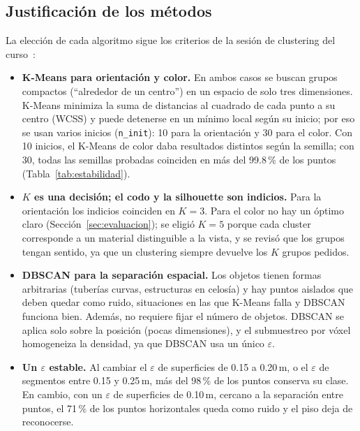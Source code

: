 \documentclass[11pt,a4paper]{article}
\begin{document}
\subsection{Justificación de los métodos}

La elección de cada algoritmo sigue los criterios de la sesión de clustering
del curso~\cite{curso}:

\begin{itemize}
  \item \textbf{K-Means para orientación y color.} En ambos casos se buscan
        grupos compactos (``alrededor de un centro'') en un espacio de solo
        tres dimensiones. K-Means minimiza la suma de distancias al cuadrado de
        cada punto a su centro (WCSS) y puede detenerse en un mínimo local según
        su inicio; por eso se usan varios inicios (\texttt{n\_init}): 10 para
        la orientación y 30 para el color. Con 10 inicios, el K-Means de color
        daba resultados distintos según la semilla; con 30, todas las semillas
        probadas coinciden en más del 99.8\,\% de los puntos
        (Tabla~\ref{tab:estabilidad}).
  \item \textbf{$K$ es una decisión; el codo y la silhouette son indicios.}
        Para la orientación los indicios coinciden en $K=3$. Para el color no
        hay un óptimo claro (Sección~\ref{sec:evaluacion}); se eligió $K=5$
        porque cada cluster corresponde a un material distinguible a la vista,
        y se revisó que los grupos tengan sentido, ya que un clustering
        siempre devuelve los $K$ grupos pedidos.
  \item \textbf{DBSCAN para la separación espacial.} Los objetos tienen formas
        arbitrarias (tuberías curvas, estructuras en celosía) y hay puntos
        aislados que deben quedar como ruido, situaciones en las que K-Means
        falla y DBSCAN funciona bien. Además, no requiere fijar el número de
        objetos. DBSCAN se aplica solo sobre la posición (pocas dimensiones), y
        el submuestreo por vóxel homogeneiza la densidad, ya que DBSCAN usa un
        único $\varepsilon$.
  \item \textbf{Un $\varepsilon$ estable.} Al cambiar el $\varepsilon$ de
        superficies de 0.15 a 0.20\,m, o el $\varepsilon$ de segmentos entre
        0.15 y 0.25\,m, más del 98\,\% de los puntos conserva su clase. En
        cambio, con un $\varepsilon$ de superficies de 0.10\,m, cercano a la
        separación entre puntos, el 71\,\% de los puntos horizontales queda como
        ruido y el piso deja de reconocerse.

\end{itemize}
\end{document}
